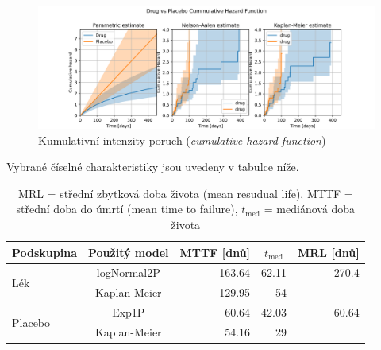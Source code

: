 \documentclass[a4, 11pt]{article}
\theoremstyle{definition}
\theoremstyle{remark}
\begin{document}
   	\begin{figure}[H]
        \centering
        \includegraphics[width=1.0\linewidth]{img/cumulative_hazard_function_drug_vs_placebo_TRIPLE.png}
        \caption{Kumulativní intenzity poruch (\textit{cumulative hazard function})}
        \label{fig:CHF_for_parametric}
    \end{figure}     
    
    
    Vybrané číselné charakteristiky jsou uvedeny v tabulce níže.
 
\begin{table}[H]
    \centering
    \begin{tabular}{@{}lcrrr@{}}
        \toprule
        \multicolumn{1}{c}{Podskupina} & Použitý model & \multicolumn{1}{c}{MTTF {[}dnů{]}} & \multicolumn{1}{c}{$t_{\mbox{med}}$} & \multicolumn{1}{c}{MRL {[}dnů{]}} \\ \midrule
        \multirow{2}{*}{Lék}     & logNormal2P  & 163.64 & 62.11 & 270.4 \\
        & Kaplan-Meier & 129.95 & 54    &       \\
        \multirow{2}{*}{Placebo} & Exp1P        & 60.64  & 42.03 & 60.64 \\
        & Kaplan-Meier & 54.16  & 29    &       \\ \bottomrule
    \end{tabular}
    \caption{MRL = střední zbytková doba života (mean resudual life), MTTF = střední doba do úmrtí (mean time to failure), $t_{\mbox{med}}$ = mediánová doba života}
    \label{tab:statistics}
\end{table}
\end{document}
